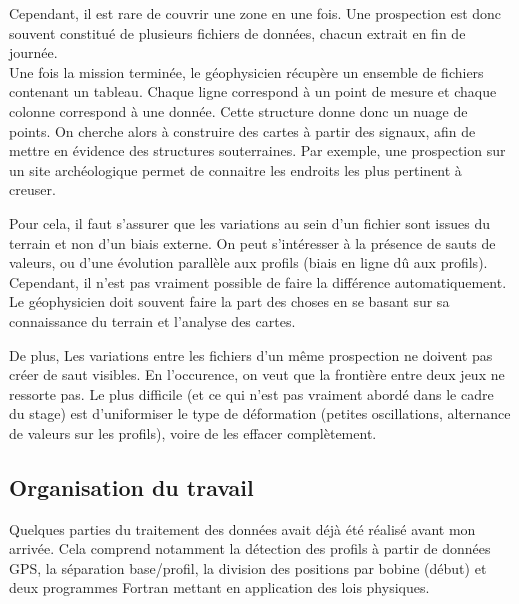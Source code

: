 \documentclass[12pt]{article}
\begin{document}
    Cependant, il est rare de couvrir une zone en une fois. Une prospection est donc souvent constitué de plusieurs fichiers de données, chacun extrait en fin de journée.\\


    Une fois la mission terminée, le géophysicien récupère un ensemble de fichiers contenant un tableau. Chaque ligne correspond à un point de mesure et chaque colonne correspond à une donnée. Cette structure donne donc un nuage de points. On cherche alors à construire des cartes à partir des signaux, afin de mettre en évidence des structures souterraines. Par exemple, une prospection sur un site archéologique permet de connaitre les endroits les plus pertinent à creuser.
    
    Pour cela, il faut s'assurer que les variations au sein d'un fichier sont issues du terrain et non d'un biais externe. On peut s'intéresser à la présence de sauts de valeurs, ou d'une évolution parallèle aux profils (biais en ligne dû aux profils). Cependant, il n'est pas vraiment possible de faire la différence automatiquement. Le géophysicien doit souvent faire la part des choses en se basant sur sa connaissance du terrain et l'analyse des cartes.
    
    De plus, Les variations entre les fichiers d'un même prospection ne doivent pas créer de saut visibles. En l'occurence, on veut que la frontière entre deux jeux ne ressorte pas. Le plus difficile (et ce qui n'est pas vraiment abordé dans le cadre du stage) est d'uniformiser le type de déformation (petites oscillations, alternance de valeurs sur les profils), voire de les effacer complètement.


\subsection{Organisation du travail}

    Quelques parties du traitement des données avait déjà été réalisé avant mon arrivée. Cela comprend notamment la détection des profils à partir de données GPS, la séparation base/profil, la division des positions par bobine (début) et deux programmes Fortran mettant en application des lois physiques.
\end{document}
